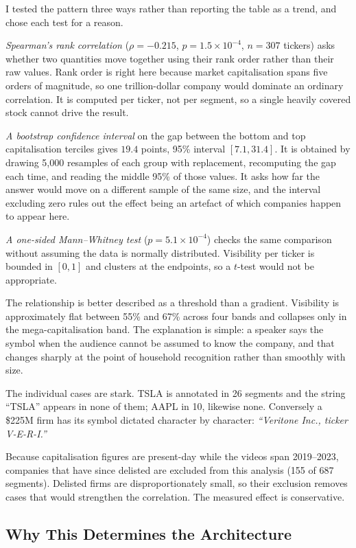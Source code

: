 \documentclass[conference]{IEEEtran}
\begin{document}
I tested the pattern three ways rather than reporting the table as a trend,
and chose each test for a reason.

\emph{Spearman's rank correlation} ($\rho = -0.215$, $p = 1.5\times10^{-4}$,
$n = 307$ tickers) asks whether two quantities move together using their rank
order rather than their raw values. Rank order is right here because market
capitalisation spans five orders of magnitude, so one trillion-dollar company
would dominate an ordinary correlation. It is computed per ticker, not per
segment, so a single heavily covered stock cannot drive the result.

\emph{A bootstrap confidence interval} on the gap between the bottom and top
capitalisation terciles gives $19.4$ points, 95\% interval $[7.1, 31.4]$. It is
obtained by drawing 5{,}000 resamples of each group with replacement,
recomputing the gap each time, and reading the middle 95\% of those values. It
asks how far the answer would move on a different sample of the same size, and
the interval excluding zero rules out the effect being an artefact of which
companies happen to appear here.

\emph{A one-sided Mann--Whitney test} ($p = 5.1\times10^{-4}$) checks the same
comparison without assuming the data is normally distributed. Visibility per
ticker is bounded in $[0,1]$ and clusters at the endpoints, so a $t$-test would
not be appropriate.

The relationship is better described as a threshold than a gradient. Visibility
is approximately flat between 55\% and 67\% across four bands and collapses only
in the mega-capitalisation band. The explanation is simple: a speaker says the symbol
when the audience cannot be assumed to know the company, and that changes
sharply at the point of household recognition rather than smoothly with size.

The individual cases are stark. TSLA is annotated in 26 segments and the string
``TSLA'' appears in none of them; AAPL in 10, likewise none. Conversely a
\$225M firm has its symbol dictated character by character: \emph{``Veritone
Inc., ticker V-E-R-I.''}

Because capitalisation figures are present-day while the videos span 2019--2023,
companies that have since delisted are excluded from this analysis (155 of 687
segments). Delisted firms are disproportionately small, so their exclusion
removes cases that would strengthen the correlation. The measured effect is
conservative.

\subsection{Why This Determines the Architecture}
\end{document}
